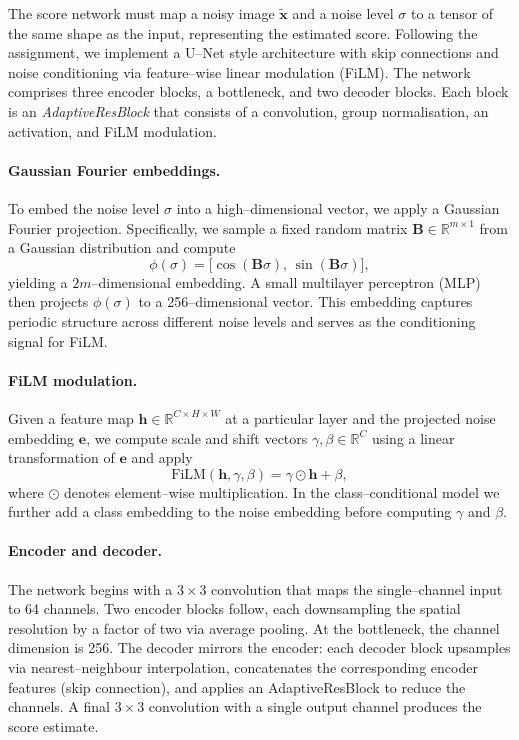 The score network must map a noisy image $\tilde{\mathbf{x}}$ and a noise
level $\sigma$ to a tensor of the same shape as the input, representing
the estimated score.  Following the assignment, we implement a U–Net
style architecture with skip connections and noise conditioning via
feature–wise linear modulation (FiLM).  The network comprises three
encoder blocks, a bottleneck, and two decoder blocks.  Each block is an
\emph{AdaptiveResBlock} that consists of a convolution, group
normalisation, an activation, and FiLM modulation.

\paragraph{Gaussian Fourier embeddings.}  To embed the noise level
$\sigma$ into a high–dimensional vector, we apply a Gaussian Fourier
projection.  Specifically, we sample a fixed random matrix $\mathbf{B}
\in\mathbb{R}^{m\times 1}$ from a Gaussian distribution and compute
\begin{equation}
    \phi(\sigma) = \big[ \cos(\mathbf{B}\sigma),\, \sin(\mathbf{B}\sigma)\big],
\end{equation}
yielding a $2m$–dimensional embedding.  A small multilayer perceptron
(MLP) then projects $\phi(\sigma)$ to a 256–dimensional vector.  This
embedding captures periodic structure across different noise levels and
serves as the conditioning signal for FiLM.

\paragraph{FiLM modulation.}  Given a feature map $\mathbf{h}\in
\mathbb{R}^{C\times H\times W}$ at a particular layer and the projected
noise embedding $\mathbf{e}$, we compute scale and shift vectors
$\gamma,\beta\in\mathbb{R}^C$ using a linear transformation of
$\mathbf{e}$ and apply
\begin{equation}
    \text{FiLM}(\mathbf{h},\gamma,\beta) = \gamma \odot \mathbf{h} + \beta,
\end{equation}
where $\odot$ denotes element–wise multiplication.  In the
class–conditional model we further add a class embedding to the noise
embedding before computing $\gamma$ and $\beta$.

\paragraph{Encoder and decoder.}  The network begins with a $3\times 3$
convolution that maps the single–channel input to 64 channels.  Two
encoder blocks follow, each downsampling the spatial resolution by a
factor of two via average pooling.  At the bottleneck, the channel
dimension is 256.  The decoder mirrors the encoder: each decoder block
upsamples via nearest–neighbour interpolation, concatenates the
corresponding encoder features (skip connection), and applies an
AdaptiveResBlock to reduce the channels.  A final $3\times 3$ convolution
with a single output channel produces the score estimate.

